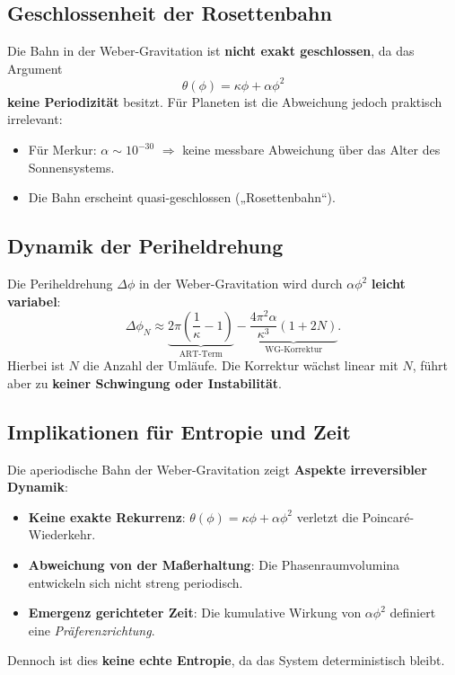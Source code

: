 \subsection{Geschlossenheit der Rosettenbahn}
Die Bahn in der Weber-Gravitation ist \textbf{nicht exakt geschlossen}, da das Argument
\begin{equation}
\theta(\phi) = \kappa\phi + \alpha \phi^2
\end{equation}
\textbf{keine Periodizität} besitzt. Für Planeten ist die Abweichung jedoch praktisch irrelevant:
\begin{itemize}
\item Für Merkur: $\alpha \sim 10^{-30}$ $\Rightarrow$ keine messbare Abweichung über das Alter des Sonnensystems.
\item Die Bahn erscheint quasi-geschlossen („Rosettenbahn“).
\end{itemize}

\subsection{Dynamik der Periheldrehung}
Die Periheldrehung $\Delta\phi$ in der Weber-Gravitation wird durch $\alpha \phi^2$ \textbf{leicht variabel}:
\begin{equation}
\Delta\phi_N \approx \underbrace{2\pi\left(\frac{1}{\kappa} - 1\right)}_{\text{ART-Term}} - \underbrace{\frac{4\pi^2 \alpha}{\kappa^3}(1 + 2N)}_{\text{WG-Korrektur}}.
\end{equation}
Hierbei ist $N$ die Anzahl der Umläufe. Die Korrektur wächst linear mit $N$, führt aber zu \textbf{keiner Schwingung oder Instabilität}.

\subsection{Implikationen für Entropie und Zeit}
Die aperiodische Bahn der Weber-Gravitation zeigt \textbf{Aspekte irreversibler Dynamik}:
\begin{itemize}
\item \textbf{Keine exakte Rekurrenz}: $\theta(\phi) = \kappa\phi + \alpha \phi^2$ verletzt die Poincaré-Wiederkehr.
\item \textbf{Abweichung von der Maßerhaltung}: Die Phasenraumvolumina entwickeln sich nicht streng periodisch.
\item \textbf{Emergenz gerichteter Zeit}: Die kumulative Wirkung von $\alpha \phi^2$ definiert eine \textit{Präferenzrichtung}.
\end{itemize}
Dennoch ist dies \textbf{keine echte Entropie}, da das System deterministisch bleibt.
